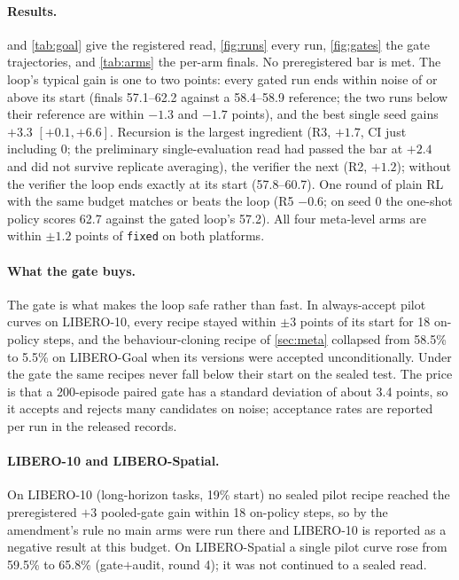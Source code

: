 \paragraph{Results.}  and \cref{tab:goal} give the registered read, \cref{fig:runs} every run, \cref{fig:gates} the gate trajectories, and \cref{tab:arms} the per-arm finals. No preregistered bar is met. The loop's typical gain is one to two points: every gated run ends within noise of or above its start (finals 57.1--62.2 against a 58.4--58.9 reference; the two runs below their reference are within $-1.3$ and $-1.7$ points), and the best single seed gains $+3.3$ $[+0.1, +6.6]$. Recursion is the largest ingredient (R3, $+1.7$, CI just including 0; the preliminary single-evaluation read had passed the bar at $+2.4$ and did not survive replicate averaging), the verifier the next (R2, $+1.2$); without the verifier the loop ends exactly at its start (57.8--60.7). One round of plain RL with the same budget matches or beats the loop (R5 $-0.6$; on seed 0 the one-shot policy scores 62.7 against the gated loop's 57.2). All four meta-level arms are within $\pm 1.2$ points of \texttt{fixed} on both platforms.

\paragraph{What the gate buys.} The gate is what makes the loop safe rather than fast. In always-accept pilot curves on LIBERO-10, every recipe stayed within $\pm 3$ points of its start for 18 on-policy steps, and the behaviour-cloning recipe of \cref{sec:meta} collapsed from 58.5\% to 5.5\% on LIBERO-Goal when its versions were accepted unconditionally. Under the gate the same recipes never fall below their start on the sealed test. The price is that a 200-episode paired gate has a standard deviation of about 3.4 points, so it accepts and rejects many candidates on noise; acceptance rates are reported per run in the released records.

\paragraph{LIBERO-10 and LIBERO-Spatial.} On LIBERO-10 (long-horizon tasks, 19\% start) no sealed pilot recipe reached the preregistered $+3$ pooled-gate gain within 18 on-policy steps, so by the amendment's rule no main arms were run there and LIBERO-10 is reported as a negative result at this budget. On LIBERO-Spatial a single pilot curve rose from 59.5\% to 65.8\% (gate$+$audit, round 4); it was not continued to a sealed read.
